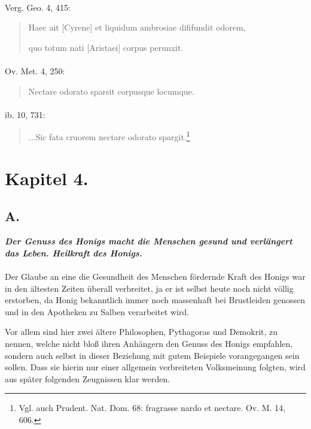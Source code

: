 \documentclass[a4paper, 11pt, oneside]{article}
\begin{document}
\paragraph{}
Verg. Geo. 4, 415:
\begin{quotation}\large
Haec ait [Cyrene] et liquidum ambrosiae dififundit odorem,

quo totum nati [Aristaei] corpus perunxit.
\end{quotation}
\paragraph{}
Ov. Met. 4, 250:
\begin{quotation}\large
Nectare odorato sparsit corpusque locumque.
\end{quotation}
\paragraph{}
ib. 10, 731:
\begin{quotation}\large
...Sic fata cruorem nectare odorato spargit.\footnote{Vgl. auch Prudent. Nat. Dom. 68: fragrasse nardo et nectare. Ov. M. 14, 606.}
\end{quotation}
\paragraph{}
\clearpage
\section{Kapitel 4.}
\subsection{A.}
\begin{center}
\textbf{\emph{Der Genuss des Honigs macht die Menschen gesund und verlängert das Leben. Heilkraft des Honigs.}}
\end{center}
\paragraph{}
Der Glaube an eine die Gesundheit des Menschen fördernde Kraft des Honigs war in den ältesten Zeiten überall verbreitet, ja er ist selbst heute noch nicht völlig erstorben, da Honig bekanntlich immer noch massenhaft bei Brustleiden genossen und in den Apotheken zu Salben verarbeitet wird.

Vor allem sind hier zwei ältere Philosophen, Pythagoras und Demokrit, zu nennen, welche nicht bloß ihren Anhängern den Genuss des Honigs empfahlen, sondern auch selbst in dieser Beziehung mit gutem Beispiele vorangegangen sein sollen. Dass sie hierin nur einer allgemein verbreiteten Volksmeinung folgten, wird aus später folgenden Zeugnissen klar werden.
\end{document}

